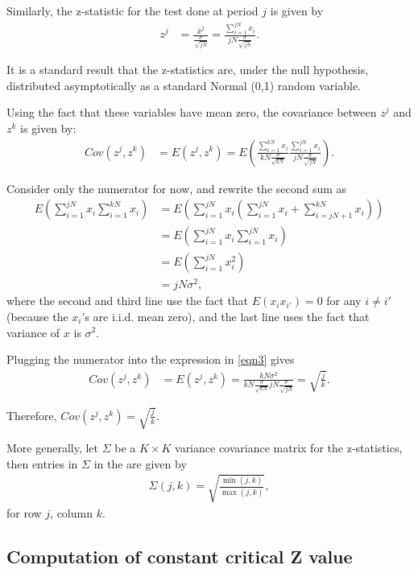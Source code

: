 \documentclass[final,3p,times]{elsarticle}
\begin{document}
Similarly, the z-statistic for the test done at period $j$ is given by 
\begin{align}
 z^j &= \frac{\bar x^j}{\frac{\sigma}{\sqrt{jN}}}=\frac{\sum_{i=1}^{jN}x_i}{jN\frac{\sigma}{\sqrt{jN}}}.
\end{align}

It is a standard result that the z-statistics are, under the null hypothesis, distributed asymptotically as a standard Normal (0,1) random variable. 

Using the fact that these variables have mean zero, the covariance between $z^j$ and $z^k$ is given by: 
\begin{align}
Cov( z^j, z^k) &= E(z^j, z^k) = E\left( \frac{\sum_{i=1}^{kN}x_i}{kN\frac{\sigma}{\sqrt{kN}}}\frac{\sum_{i=1}^{jN}x_i}{jN\frac{\sigma}{\sqrt{jN}}}\right). \label{eqn3}
\end{align}


Consider only the numerator for now, and rewrite the second sum as 
\begin{align*}
E\left(\sum_{i=1}^{jN}x_i\sum_{i=1}^{kN}x_i \right) 
&= E\left(\sum_{i=1}^{jN}x_i \left(\sum_{i=1}^{jN}x_i + \sum_{i=jN+1}^{kN}x_i \right)\right)\\
&= E\left(\sum_{i=1}^{jN}x_i \sum_{i=1}^{jN}x_i\right)\\
&= E\left(\sum_{i=1}^{jN}x_i^2\right)\\
&= jN\sigma^2,
\end{align*}
where the second and third line use the fact that $E(x_i x_{i'}) = 0$ for any $i\neq i'$ (because the $x_i$'s are i.i.d. mean zero), and the last line uses the fact that variance of $x$ is $\sigma^2$.

Plugging the numerator into the expression in \eqref{eqn3} gives
\begin{align*}
Cov( z^j, z^k) &= E(z^j, z^k) = \frac{kN\sigma^2}{kN\frac{\sigma}{\sqrt{kN}}jN\frac{\sigma}{\sqrt{jN}}} = \sqrt{\frac{j}{k}}. 
\end{align*}

Therefore, $Cov( z^j, z^k) = \sqrt{\frac{j}{k}}$. 

More generally, let $\Sigma$ be a $K\times K$ variance covariance matrix for the z-statistics, then entries in $\Sigma$ in the are given by
\begin{align}
\Sigma(j, k) =\sqrt{\frac{\min(j,k)}{\max(j,k)}},\label{eqn4}
\end{align}
for row $j$, column $k$.

\subsection{Computation of constant critical Z value}
\end{document}

